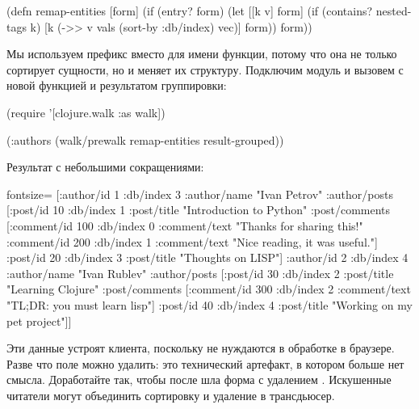 \begin{english}
  \begin{clojure}
(defn remap-entities
  [form]
  (if (entry? form)
    (let [[k v] form]
      (if (contains? nested-tags k)
        [k (->> v vals (sort-by :db/index) vec)]
        form))
    form))
  \end{clojure}
\end{english}

Мы используем префикс  вместо  для имени функции, потому что она не только сортирует сущности, но и меняет их структуру. Подключим модуль  и вызовем  с новой функцией и результатом группировки:

\begin{english}
  \begin{clojure}
(require '[clojure.walk :as walk])

(:authors
 (walk/prewalk remap-entities result-grouped))
  \end{clojure}
\end{english}

Результат с небольшими сокращениями:

\begin{english}
  \begin{clojure*}{fontsize=\small}
[{:author/id 1
  :db/index 3
  :author/name "Ivan Petrov"
  :author/posts
  [{:post/id 10
    :db/index 1
    :post/title "Introduction to Python"
    :post/comments
    [{:comment/id 100
      :db/index 0
      :comment/text "Thanks for sharing this!"}
     {:comment/id 200
      :db/index 1
      :comment/text "Nice reading, it was useful."}]}
   {:post/id 20
    :db/index 3
    :post/title "Thoughts on LISP"}]}
 {:author/id 2
  :db/index 4
  :author/name "Ivan Rublev"
  :author/posts
  [{:post/id 30
    :db/index 2
    :post/title "Learning Clojure"
    :post/comments
    [{:comment/id 300
      :db/index 2
      :comment/text "TL;DR: you must learn lisp"}]}
   {:post/id 40
    :db/index 4
    :post/title "Working on my pet project"}]}]
  \end{clojure*}
\end{english}

Эти данные устроят клиента, поскольку не нуждаются в обработке в браузере. Разве что поле  можно удалить: это технический артефакт, в котором больше нет смысла. Доработайте  так, чтобы после  шла форма с удалением . Искушенные читатели могут объединить сортировку и удаление в трансдьюсер.

